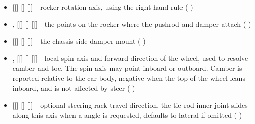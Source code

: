 \begin{itemize}
    \item {} [[] [] []] - rocker rotation axis, using the right hand rule (  )

    \item {},  [[] [] []] - the points on the rocker where the pushrod and damper attach (  )

    \item {} [[] [] []] - the chassis side damper mount (  )

    \item {},  [[] [] []] - local spin axis and forward direction of the wheel, used to resolve camber and toe. The spin axis may point inboard or outboard. Camber is reported relative to the car body, negative when the top of the wheel leans inboard, and is not affected by steer (  )

    \item {} [[] [] []] - optional steering rack travel direction, the tie rod inner joint slides along this axis when a  angle is requested, defaults to lateral  if omitted (  )
\end{itemize}

